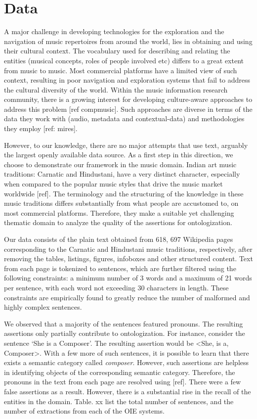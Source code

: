 \documentclass{llncs}
\begin{document}
\section{Data}
\label{sec:data}
A major challenge in developing technologies for the exploration and the navigation of music repertoires from around the world, lies in obtaining and using their cultural context. The vocabulary used for describing and relating the entities (musical concepts, roles of people involved etc) differs to a great extent from music to music. Most commercial platforms have a limited view of such context, resulting in poor navigation and exploration systems that fail to address the cultural diversity of the world.  Within the music information research community, there is a growing interest for developing culture-aware approaches to address this problem [ref compmusic]. Such approaches are diverse in terms of the data they work with (audio, metadata and contextual-data) and methodologies they employ [ref: mires]. 

However, to our knowledge, there are no major attempts that use text, arguably the largest openly available data source. As a first step in this direction, we choose to demonstrate our framework in the music domain. Indian art music traditions: Carnatic and Hindustani, have a very distinct character, especially when compared to the popular music styles that drive the music market worldwide [ref]. The terminology and the structuring of the knowledge in these music traditions differs substantially from what people are accustomed to, on most commercial platforms. Therefore, they make a suitable yet challenging thematic domain to analyze the quality of the assertions for ontologization. 

Our data consists of the plain text obtained from 618, 697 Wikipedia pages corresponding to the Carnatic and Hindustani music traditions, respectively, after removing the tables, listings, figures, infoboxes and other structured content. Text from each page is tokenized to sentences, which are further filtered using the following constraints: a minimum number of 3 words and a maximum of 21 words per sentence, with each word not exceeding 30 characters in length. These constraints are empirically found to greatly reduce the number of malformed and highly complex sentences.

We observed that a majority of the sentences featured pronouns. The resulting assertions only partially contribute to ontologization. For instance, consider the sentence `She is a Composer'. The resulting assertion would be <She, is a, Composer>. With a few more of such sentences, it is possible to learn that there exists a semantic category called \textit{composer}. However, such assertions are helpless in identifying objects of the corresponding semantic category. Therefore, the pronouns in the text from each page are resolved using [ref]. There were a few false assertions as a result. However, there is a substantial rise in the recall of the entities in the domain. Table. xx list the total number of sentences, and the number of extractions from each of the OIE systems.
\end{document}
